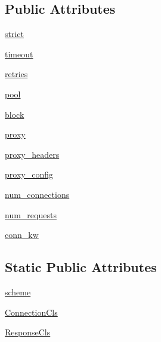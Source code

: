 \subsection*{Public Attributes}
\begin{DoxyCompactItemize}
\item 
\hyperlink{classpip_1_1__vendor_1_1urllib3_1_1connectionpool_1_1HTTPConnectionPool_a1084d4788cf733c417a2c7b30aa749b4}{strict}
\item 
\hyperlink{classpip_1_1__vendor_1_1urllib3_1_1connectionpool_1_1HTTPConnectionPool_a43c45441e89c527cd109ddcfdd371e62}{timeout}
\item 
\hyperlink{classpip_1_1__vendor_1_1urllib3_1_1connectionpool_1_1HTTPConnectionPool_a78a4bbd8c180f2cf92c9bf0004be3168}{retries}
\item 
\hyperlink{classpip_1_1__vendor_1_1urllib3_1_1connectionpool_1_1HTTPConnectionPool_a41cd8bb703d5881769bc63e1b5993abf}{pool}
\item 
\hyperlink{classpip_1_1__vendor_1_1urllib3_1_1connectionpool_1_1HTTPConnectionPool_ab75440494cfe89f84809b416845fea8c}{block}
\item 
\hyperlink{classpip_1_1__vendor_1_1urllib3_1_1connectionpool_1_1HTTPConnectionPool_afb378fc62db6b96f88d24d4fb59e088b}{proxy}
\item 
\hyperlink{classpip_1_1__vendor_1_1urllib3_1_1connectionpool_1_1HTTPConnectionPool_a88ade434db0494b93d0bdf4fd6ada017}{proxy\+\_\+headers}
\item 
\hyperlink{classpip_1_1__vendor_1_1urllib3_1_1connectionpool_1_1HTTPConnectionPool_a6ba563710c6c9366215b627e09645492}{proxy\+\_\+config}
\item 
\hyperlink{classpip_1_1__vendor_1_1urllib3_1_1connectionpool_1_1HTTPConnectionPool_a1e9d139764fc51f3d3f6bddb667ea38d}{num\+\_\+connections}
\item 
\hyperlink{classpip_1_1__vendor_1_1urllib3_1_1connectionpool_1_1HTTPConnectionPool_ab5649fdd50fc968e59683db2309fede1}{num\+\_\+requests}
\item 
\hyperlink{classpip_1_1__vendor_1_1urllib3_1_1connectionpool_1_1HTTPConnectionPool_aa9915cfa4a109bb783fe65c9ca484ef0}{conn\+\_\+kw}
\end{DoxyCompactItemize}
\subsection*{Static Public Attributes}
\begin{DoxyCompactItemize}
\item 
\hyperlink{classpip_1_1__vendor_1_1urllib3_1_1connectionpool_1_1HTTPConnectionPool_a6c23f18bb8be9f236fdc1bc22ee8ef2d}{scheme}
\item 
\hyperlink{classpip_1_1__vendor_1_1urllib3_1_1connectionpool_1_1HTTPConnectionPool_a654cb61383603a29c1d8ebc0a91cb71f}{Connection\+Cls}
\item 
\hyperlink{classpip_1_1__vendor_1_1urllib3_1_1connectionpool_1_1HTTPConnectionPool_a4946b10a8566f5cc8861b5afef7dff16}{Response\+Cls}
\end{DoxyCompactItemize}



